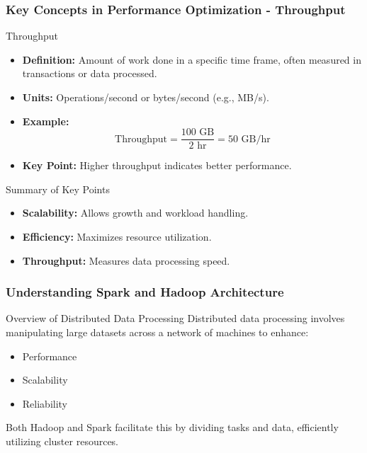 \documentclass{beamer}
\begin{document}
\begin{frame}[fragile]
    \frametitle{Key Concepts in Performance Optimization - Throughput}

    \begin{block}{Throughput}
        \begin{itemize}
            \item \textbf{Definition:} Amount of work done in a specific time frame, often measured in transactions or data processed.
            \item \textbf{Units:} Operations/second or bytes/second (e.g., MB/s).
            \item \textbf{Example:}
            \begin{equation}
                \text{Throughput} = \frac{100 \text{ GB}}{2 \text{ hr}} = 50 \text{ GB/hr}
            \end{equation}
            \item \textbf{Key Point:} Higher throughput indicates better performance.
        \end{itemize}
    \end{block}

    \begin{block}{Summary of Key Points}
        \begin{itemize}
            \item \textbf{Scalability:} Allows growth and workload handling.
            \item \textbf{Efficiency:} Maximizes resource utilization.
            \item \textbf{Throughput:} Measures data processing speed.
        \end{itemize}
    \end{block}
    
\end{frame}

\begin{frame}[fragile]
    \frametitle{Understanding Spark and Hadoop Architecture}
    \begin{block}{Overview of Distributed Data Processing}
        Distributed data processing involves manipulating large datasets across a network of machines to enhance:
        \begin{itemize}
            \item Performance
            \item Scalability
            \item Reliability
        \end{itemize}
        Both Hadoop and Spark facilitate this by dividing tasks and data, efficiently utilizing cluster resources.
    \end{block}
\end{frame}
\end{document}
